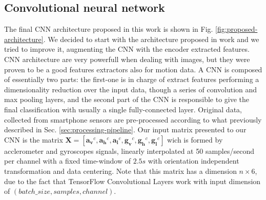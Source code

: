 \subsection{Convolutional neural network}
\label{subsec:cnn}
The final CNN architecture proposed in this work is shown in Fig. \ref{fig:proposed-architecture}. We decided to start with the architecture proposed in work \cite{chen2020deep} and we tried to improve it, augmenting the CNN with the encoder extracted features. CNN architecture are very powerfull when dealing with images, but they were proven to be a good features extractors also for motion data. A CNN is composed of essentially two parts: the first-one is in charge of extract features performing a dimensionality reduction over the input data, though a series of convolution and max pooling layers, and the second part of the CNN is responsible to give the final classification with usually a single fully-connected layer. Original data, collected from smartphone sensors are pre-processed according to what previously described in Sec. \ref{sec:processing-pipeline}. Our input matrix presented to our CNN is the matrix \mbox{$ \boldsymbol{X} = [ \boldsymbol{a_{v}}^{c}, \boldsymbol{a_{h}}^{c}, \boldsymbol{a_{l}}^{c}, \boldsymbol{g_{v}}^{c}, \boldsymbol{g_{h}}^{c}, \boldsymbol{g_{l}}^{c}]$} wich is formed by acclerometer and gyroscopes signals, linearly interpolated at 50 samples/second  per channel with a fixed time-window of $2.5s$ with orientation independent transformation and data centering. Note that this matrix has a dimension $n \times 6$, due to the fact that TensorFlow Convolutional Layers work with input dimension of $(batch\_size, samples, channel)$.

